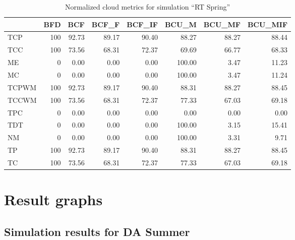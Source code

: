\begin{table}[ht]
\centering
\begin{tabular}{lrrrrrrr}
\toprule
{} &  BFD &    BCF &  BCF\_F &  BCF\_IF &   BCU\_M &  BCU\_MF &  BCU\_MIF \\
\midrule
TCP   &  100 &  92.73 &  89.17 &   90.40 &   88.27 &   88.27 &    88.44 \\
TCC   &  100 &  73.56 &  68.31 &   72.37 &   69.69 &   66.77 &    68.33 \\
ME    &    0 &   0.00 &   0.00 &    0.00 &  100.00 &    3.47 &    11.23 \\
MC    &    0 &   0.00 &   0.00 &    0.00 &  100.00 &    3.47 &    11.24 \\
TCPWM &  100 &  92.73 &  89.17 &   90.40 &   88.31 &   88.27 &    88.45 \\
TCCWM &  100 &  73.56 &  68.31 &   72.37 &   77.33 &   67.03 &    69.18 \\
TPC   &    0 &   0.00 &   0.00 &    0.00 &    0.00 &    0.00 &     0.00 \\
TDT   &    0 &   0.00 &   0.00 &    0.00 &  100.00 &    3.15 &    15.41 \\
NM    &    0 &   0.00 &   0.00 &    0.00 &  100.00 &    3.31 &     9.71 \\
TP    &  100 &  92.73 &  89.17 &   90.40 &   88.31 &   88.27 &    88.45 \\
TC    &  100 &  73.56 &  68.31 &   72.37 &   77.33 &   67.03 &    69.18 \\
\bottomrule
\end{tabular}
\caption{Normalized cloud metrics for simulation "`RT Spring"'}
\end{table}


\newpage


\FloatBarrier
\section{Result graphs} \label{sec:app_result_simulation_graphs}


\subsection{Simulation results for DA Summer}

\newpage

